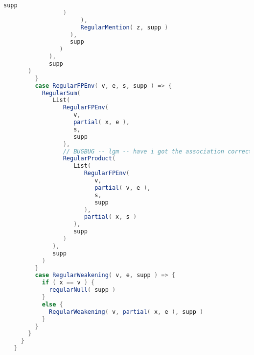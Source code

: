 \begin{lstlisting}[language=Scala,mathescape=true]
                            supp
		         )
                      ),
                      RegularMention( z, supp )
                   ),
                   supp
                )
             ),
             supp
	   )
         }
         case RegularFPEnv( v, e, s, supp ) => {
           RegularSum(
              List(
                 RegularFPEnv(
                    v,
                    partial( x, e ),
                    s,
                    supp
                 ),
                 // BUGBUG -- lgm -- have i got the association correct
                 RegularProduct(
                    List(
                       RegularFPEnv(
                          v,
                          partial( v, e ),
                          s,
                          supp
                       ),
                       partial( x, s )
                    ),
                    supp
                 )
              ),
              supp
           )
         }
         case RegularWeakening( v, e, supp ) => {
           if ( x == v ) {
             regularNull( supp )
           }
           else {
             RegularWeakening( v, partial( x, e ), supp )
           }
         }
       }
     }
   }
\end{lstlisting}